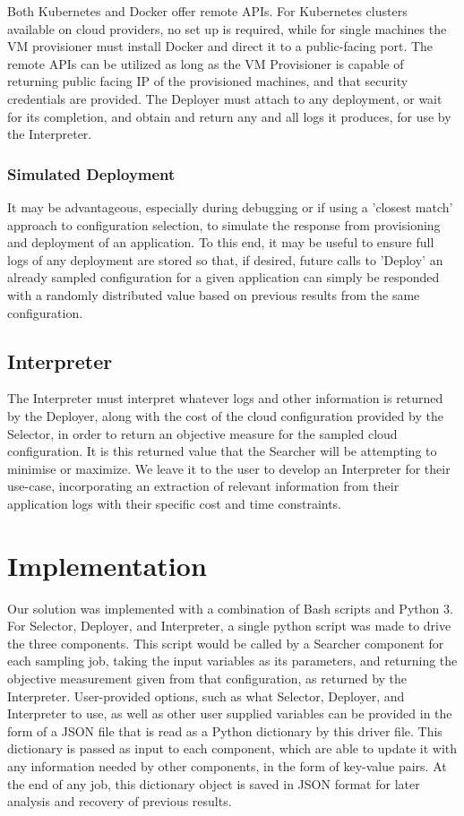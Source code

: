 \documentclass{article}
\begin{document}
Both Kubernetes and Docker offer remote APIs. For Kubernetes clusters available on cloud providers, no set up is required, while for single machines the VM provisioner must install Docker and direct it to a public-facing port. The remote APIs can be utilized as long as the VM Provisioner is capable of returning public facing IP of the provisioned machines, and that security credentials are provided. The Deployer must attach to any deployment, or wait for its completion, and obtain and return any and all logs it produces, for use by the Interpreter.

\subsubsection{Simulated Deployment}
It may be advantageous, especially during debugging or if using a 'closest match' approach to configuration selection, to simulate the response from provisioning and deployment of an application. To this end, it may be useful to ensure full logs of any deployment are stored so that, if desired, future calls to 'Deploy' an already sampled configuration for a given application can simply be responded with a randomly distributed value based on previous results from the same configuration.

\subsection{Interpreter}
The Interpreter must interpret whatever logs and other information is returned by the Deployer, along with the cost of the cloud configuration provided by the Selector, in order to return an objective measure for the sampled cloud configuration. It is this returned value that the Searcher will be attempting to minimise or maximize. We leave it to the user to develop an Interpreter for their use-case, incorporating an extraction of relevant information from their application logs with their specific cost and time constraints. 

\section{Implementation}
Our solution was implemented with a combination of Bash scripts and Python 3. For Selector, Deployer, and Interpreter, a single python script was made to drive the three components. This script would be called by a Searcher component for each sampling job, taking the input variables as its parameters, and returning the objective measurement given from that configuration, as returned by the Interpreter. User-provided options, such as what Selector, Deployer, and Interpreter to use, as well as other user supplied variables can be provided in the form of a JSON file that is read as a Python dictionary by this driver file. This dictionary is passed as input to each component, which are able to update it with any information needed by other components, in the form of key-value pairs. At the end of any job, this dictionary object is saved in JSON format for later analysis and recovery of previous results.
\end{document}
